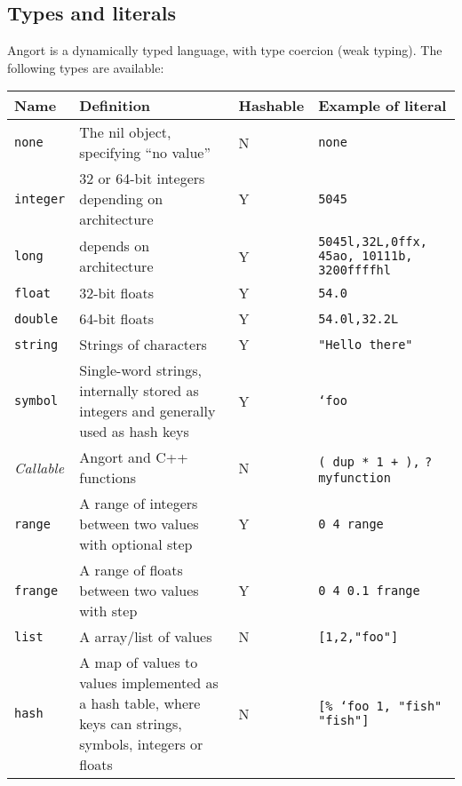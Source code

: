 \subsection{Types and literals}
\label{types}
Angort is a dynamically typed language, with type coercion (weak typing).
The following types are available:
\indw{[}\indw{]}
\begin{center}
\begin{tabular}{|l|p{2.5in}|l|p{1.5in}|}\hline
\textbf{Name\footnotemark[1]} & \textbf{Definition} & \textbf{Hashable\footnotemark[2]} & \textbf{Example of literal} \\ \hline
\texttt{none} & The nil object, specifying ``no value'' & N & \texttt{none} \\
\texttt{integer} & 32 or 64-bit integers depending on architecture & Y & \texttt{5045} \\
\texttt{long} & depends on architecture & Y & \texttt{5045l,32L,0ffx, 45ao, 10111b, 3200ffffhl} \\
\texttt{float} & 32-bit floats & Y & \texttt{54.0} \\
\texttt{double} & 64-bit floats & Y & \texttt{54.0l,32.2L} \\
\texttt{string} & Strings of characters & Y & \texttt{"Hello there"}\footnotemark[3] \\
\texttt{symbol} & Single-word strings, internally stored as integers and
generally used as hash keys & Y & \texttt{`foo} \\
\emph{Callable}\footnotemark[4] & Angort and C++ functions & N & \texttt{( dup * 1 + ),} \texttt{?myfunction} \\
\texttt{range} & 
A range of integers between two values with optional step & Y & 
\texttt{0 4 range}\footnotemark[5]\\
\texttt{frange} & A range of floats between two values with 
step& Y & \texttt{0 4 0.1 frange}\\
\texttt{list} & A array/list of values\footnotemark[6] & N & \texttt{[1,2,"foo"]} \\
\texttt{hash} & A map of values to values implemented as a hash table, where
keys can strings, symbols, integers or floats & N & \texttt{[\% `foo 1, "fish" "fish"]} \\
\hline
\end{tabular}
\end{center}

